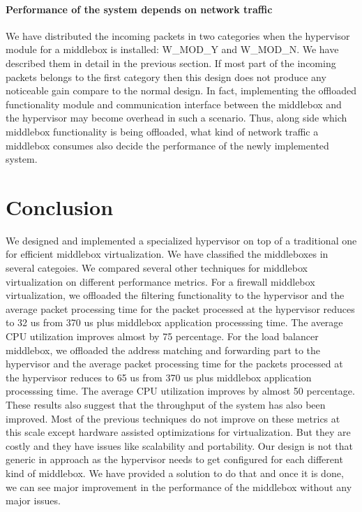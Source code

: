 \documentclass[a4paper,11pt]{report}
\begin{document}
\subsubsection{Performance of the system depends on network traffic}
We have distributed the incoming packets in two categories when the hypervisor module for a middlebox is installed: W\_MOD\_Y and W\_MOD\_N. We have described them in detail in the previous section. If most part of the incoming packets belongs to the first category then this design does not produce any noticeable gain compare to the normal design. In fact, implementing the offloaded functionality module and communication interface between the middlebox and the hypervisor may become overhead in such a scenario. Thus, along side which middlebox functionality is being offloaded, what kind of network traffic a middlebox consumes also decide the performance of the newly implemented system.            

\chapter{Conclusion}
We designed and implemented a specialized hypervisor on top of a traditional one for efficient middlebox virtualization. We have classified the middleboxes in several categoies. We compared several other techniques for middlebox virtualization on different performance metrics. For a firewall middlebox virtualization, we offloaded the filtering functionality to the hypervisor and the average packet processing time for the packet processed at the hypervisor reduces to 32 us from 370 us plus middlebox application processsing time. The average CPU utilization improves almost by 75 percentage. For the load balancer middlebox, we offloaded the address matching and forwarding part to the hypervisor and the average packet processing time for the packets processed at the hypervisor reduces to 65 us from 370 us plus middlebox application processsing time. The average CPU utilization improves by almost 50 percentage. These results also suggest that the throughput of the system has also been improved. Most of the previous techniques do not improve on these metrics at this scale except hardware assisted optimizations for virtualization. But they are costly and they have issues like scalability and portability. Our design is not that generic in approach as the hypervisor needs to get configured for each different kind of middlebox. We have provided a solution to do that and once it is done, we can see major improvement in the performance of the middlebox without any major issues.              
\bigskip
\end{document}
